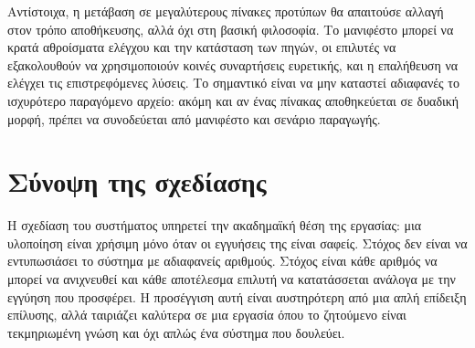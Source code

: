 Αντίστοιχα, η μετάβαση σε μεγαλύτερους πίνακες προτύπων θα απαιτούσε αλλαγή στον τρόπο αποθήκευσης, αλλά όχι στη βασική φιλοσοφία. Το μανιφέστο μπορεί να κρατά αθροίσματα ελέγχου και την κατάσταση των πηγών, οι επιλυτές να εξακολουθούν να χρησιμοποιούν κοινές συναρτήσεις ευρετικής, και η επαλήθευση να ελέγχει τις επιστρεφόμενες λύσεις. Το σημαντικό είναι να μην καταστεί αδιαφανές το ισχυρότερο παραγόμενο αρχείο: ακόμη και αν ένας πίνακας αποθηκεύεται σε δυαδική μορφή, πρέπει να συνοδεύεται από μανιφέστο και σενάριο παραγωγής.

\section{Σύνοψη της σχεδίασης}
\label{sec:design-summary}
Η σχεδίαση του συστήματος υπηρετεί την ακαδημαϊκή θέση της εργασίας: μια υλοποίηση είναι χρήσιμη μόνο όταν οι εγγυήσεις της είναι σαφείς. Στόχος δεν είναι να εντυπωσιάσει το σύστημα με αδιαφανείς αριθμούς. Στόχος είναι κάθε αριθμός να μπορεί να ανιχνευθεί και κάθε αποτέλεσμα επιλυτή να κατατάσσεται ανάλογα με την εγγύηση που προσφέρει. Η προσέγγιση αυτή είναι αυστηρότερη από μια απλή επίδειξη επίλυσης, αλλά ταιριάζει καλύτερα σε μια εργασία όπου το ζητούμενο είναι τεκμηριωμένη γνώση και όχι απλώς ένα σύστημα που δουλεύει.

